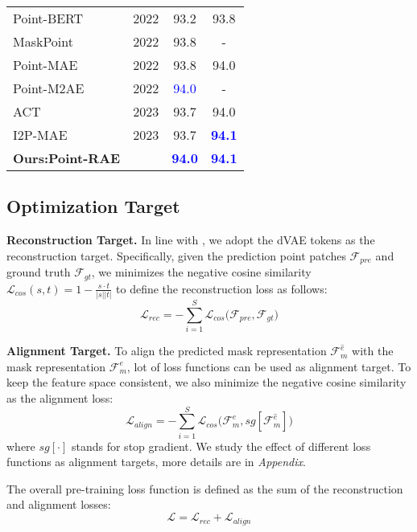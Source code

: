 \documentclass[sigconf, screen]{acmart}
\begin{document}
\begin{table}
\begin{tabular}{@{}lccc}
Point-BERT \cite{yu2022point} &2022&93.2  &93.8  \\
MaskPoint \cite{liu2022masked}&2022 &93.8 & - \\
Point-MAE \cite{pang2022masked}&2022 &93.8 &94.0\\
Point-M2AE \cite{zhang2022masked} &2022&\textcolor{blue}{94.0} &-\\
ACT \cite{dong2022autoencoders}&2023 &93.7 &94.0  \\
I2P-MAE \cite{zhang2022learning}&2023 &93.7 &\textcolor{blue}{\bf94.1}  \\
\textbf{Ours:Point-RAE}  &&\textcolor{blue}{\bf 94.0} &\textcolor{blue}{\bf 94.1} \\


\bottomrule[1pt]

\end{tabular}
\label{modelnet}
\end{table}

\subsection{Optimization Target}
\noindent \textbf{Reconstruction Target.}
In line with \cite{dong2022autoencoders}, we adopt the dVAE tokens as the reconstruction target. Specifically, given the prediction point patches $\mathcal{F}_{pre}$ and ground truth $\mathcal{F}_{gt}$, we minimizes the negative cosine similarity $\mathcal{L}_{cos}(s,t) = 1 - \frac{s \cdot t}{\lvert s \rvert\lvert t \rvert}$ to define the reconstruction loss as follows:
\begin{equation}
    \mathcal{L}_{rec} = -\sum_{i=1}^S{\mathcal{L}_{cos}(\mathcal{F}_{pre}, \mathcal{F}_{gt}})
\end{equation}

\noindent \textbf{Alignment Target.}
To align the predicted mask representation $\mathcal{F}_m^{\hat{e}}$ with the mask representation $\mathcal{F}_m^e$, lot of loss functions can be used as alignment target.
To keep the feature space consistent, we also minimize the negative cosine similarity as the alignment loss:
\begin{equation}
    \mathcal{L}_{align} = -\sum_{i=1}^S{\mathcal{L}_{cos}(
    \mathcal{F}_m^e, sg[\mathcal{F}_m^{\hat{e}}]}
    )
\end{equation}
where $sg[\cdot]$ stands for stop gradient.
We study the effect of different loss functions as alignment targets, more details are in \textit{Appendix}.

The overall pre-training loss function is defined as the sum of the reconstruction and alignment losses:
\begin{equation}
    \mathcal{L} = \mathcal{L}_{rec} + \mathcal{L}_{align}
\end{equation}
\end{document}

